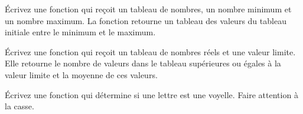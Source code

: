 \documentclass[french]{article}
\begin{document}
\begin{question}{7}
	Écrivez une fonction qui reçoit un tableau de nombres, un nombre minimum et un nombre maximum. La fonction retourne un tableau des valeurs du tableau initiale entre le minimum et le maximum.
\end{question}
\vfill
\begin{solution}
	
\end{solution}
\newpage

\begin{question}{10}
	Écrivez une fonction qui reçoit un tableau de nombres réels et une valeur limite. Elle retourne le nombre de valeurs dans le tableau supérieures ou égales à la valeur limite et la moyenne de ces valeurs.
\end{question}
\vfill
\begin{solution}
	
\end{solution}

\newpage
\begin{question}{10}
	Écrivez une fonction qui détermine si une lettre est une voyelle. Faire attention à la casse.
\end{question}
\vfill
\begin{solution}
	
\end{solution}

\newpage
\end{document}
